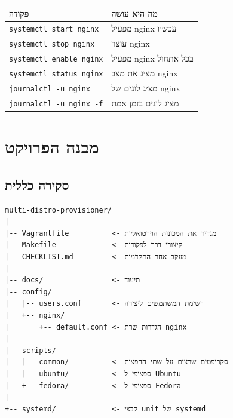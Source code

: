 \documentclass[12pt,a4paper]{article}
\begin{document}
\begin{center}
\end{center}

\begin{center}
\begin{tabular}{ll}
\toprule
\textbf{פקודה} & \textbf{מה היא עושה} \\
\midrule
\texttt{systemctl start nginx} & מפעיל nginx עכשיו \\
\texttt{systemctl stop nginx} & עוצר nginx \\
\texttt{systemctl enable nginx} & מפעיל nginx בכל אתחול \\
\texttt{systemctl status nginx} & מציג את מצב nginx \\
\texttt{journalctl -u nginx} & מציג לוגים של nginx \\
\texttt{journalctl -u nginx -f} & מציג לוגים בזמן אמת \\
\bottomrule
\end{tabular}
\end{center}

\newpage
\section{מבנה הפרויקט}

\subsection{סקירה כללית}

\begin{lstlisting}[caption={מבנה תיקיות הפרויקט}]
multi-distro-provisioner/
|
|-- Vagrantfile          <- מגדיר את המכונות הוירטואליות
|-- Makefile             <- קיצורי דרך לפקודות
|-- CHECKLIST.md         <- מעקב אחר התקדמות
|
|-- docs/                <- תיעוד
|-- config/
|   |-- users.conf       <- רשימת המשתמשים ליצירה
|   +-- nginx/
|       +-- default.conf <- הגדרות שרת nginx
|
|-- scripts/
|   |-- common/          <- סקריפטים שרצים על שתי ההפצות
|   |-- ubuntu/          <- ספציפי ל-Ubuntu
|   +-- fedora/          <- ספציפי ל-Fedora
|
+-- systemd/             <- קבצי unit של systemd
\end{lstlisting}
\end{document}
